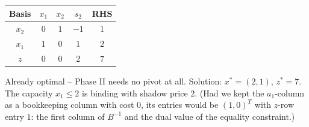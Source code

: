 \begin{solutions}
        \begin{center}
        \begin{tabular}{c|ccc|c}
        Basis & $x_{1}$ & $x_{2}$ & $s_{2}$ & RHS\\
        \hline
        $x_{2}$ & $0$ & $1$ & $-1$ & $1$\\
        $x_{1}$ & $1$ & $0$ & $1$ & $2$\\
        \hline
        $z$ & $0$ & $0$ & $2$ & $7$\\
        \end{tabular}
        \end{center}
        Already optimal -- Phase II needs no pivot at all. Solution:
        $x^{*}=(2,1)$, $z^{*}=7$. The capacity $x_{1}\le 2$ is binding with
        shadow price $2$. (Had we kept the $a_{1}$-column as a bookkeeping
        column with cost $0$, its entries would be $(1,0)^{T}$ with $z$-row
        entry $1$: the first column of $B^{-1}$ and the dual value of the
        equality constraint.)


\end{solutions}
